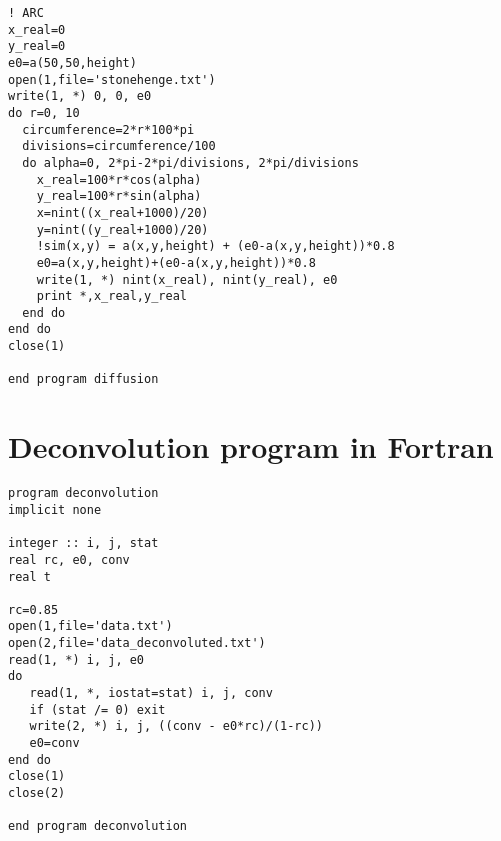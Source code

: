 \begin{lstlisting}
! ARC
x_real=0
y_real=0
e0=a(50,50,height)
open(1,file='stonehenge.txt')
write(1, *) 0, 0, e0
do r=0, 10
  circumference=2*r*100*pi
  divisions=circumference/100
  do alpha=0, 2*pi-2*pi/divisions, 2*pi/divisions
    x_real=100*r*cos(alpha)
    y_real=100*r*sin(alpha)
    x=nint((x_real+1000)/20)
    y=nint((y_real+1000)/20)
    !sim(x,y) = a(x,y,height) + (e0-a(x,y,height))*0.8
    e0=a(x,y,height)+(e0-a(x,y,height))*0.8
    write(1, *) nint(x_real), nint(y_real), e0
    print *,x_real,y_real
  end do
end do
close(1)
       
end program diffusion
\end{lstlisting}
	
	\section{Deconvolution program in Fortran}
\begin{lstlisting}
program deconvolution
implicit none

integer :: i, j, stat
real rc, e0, conv
real t

rc=0.85
open(1,file='data.txt')
open(2,file='data_deconvoluted.txt')
read(1, *) i, j, e0
do
   read(1, *, iostat=stat) i, j, conv
   if (stat /= 0) exit
   write(2, *) i, j, ((conv - e0*rc)/(1-rc))
   e0=conv
end do
close(1) 
close(2)

end program deconvolution
\end{lstlisting}

